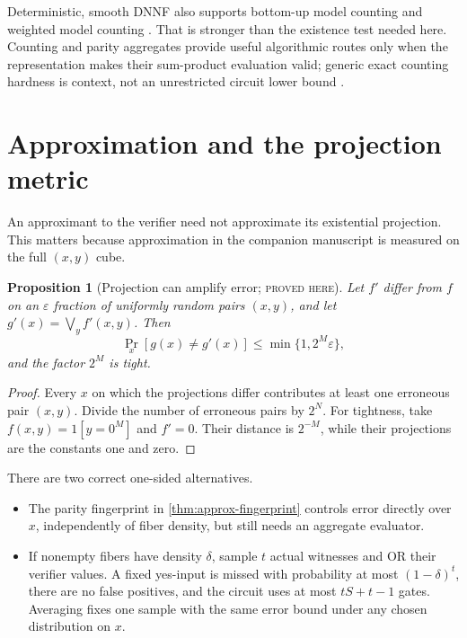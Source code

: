 \documentclass[11pt]{article}
\newtheorem{proposition}[proposition]{Proposition}
\theoremstyle{definition}
\theoremstyle{remark}
\newcommand{\eps}{\varepsilon}
\newcommand{\status}[1]{\textsc{#1}}
\begin{document}
Deterministic, smooth DNNF also supports bottom-up model counting and weighted
model counting \cite{ChaviraDarwiche2008}.  That is stronger than the existence
test needed here.
Counting and parity aggregates provide useful algorithmic routes only when the
representation makes their sum-product evaluation valid; generic exact
counting hardness is context, not an unrestricted circuit lower bound
\cite{Valiant1979}.

\section{Approximation and the projection metric}
\label{sec:approximation}

An approximant to the verifier need not approximate its existential
projection.  This matters because approximation in the companion manuscript
is measured on the full $(x,y)$ cube.

\begin{proposition}[Projection can amplify error; \status{proved here}]
\label{prop:error-amplification}
Let $f'$ differ from $f$ on an $\eps$ fraction of uniformly random pairs
$(x,y)$, and let $g'(x)=\bigvee_yf'(x,y)$.  Then
\[
  \Pr_x[g(x)\ne g'(x)]\le\min\{1,2^M\eps\},
  \tag{7.1}\label{eq:error-amplification}
\]
and the factor $2^M$ is tight.
\end{proposition}

\begin{proof}
Every $x$ on which the projections differ contributes at least one erroneous
pair $(x,y)$.  Divide the number of erroneous pairs by $2^N$.  For tightness,
take $f(x,y)=1[y=0^M]$ and $f'=0$.  Their distance is $2^{-M}$, while their
projections are the constants one and zero.
\end{proof}

There are two correct one-sided alternatives.

\begin{itemize}
\item The parity fingerprint in \cref{thm:approx-fingerprint} controls error
directly over $x$, independently of fiber density, but still needs an
aggregate evaluator.
\item If nonempty fibers have density $\delta$, sample $t$ actual witnesses
and OR their verifier values.  A fixed yes-input is missed with probability at
most $(1-\delta)^t$, there are no false positives, and the circuit uses at
most $tS+t-1$ gates.  Averaging fixes one sample with the same error bound
under any chosen distribution on $x$.
\end{itemize}
\end{document}
